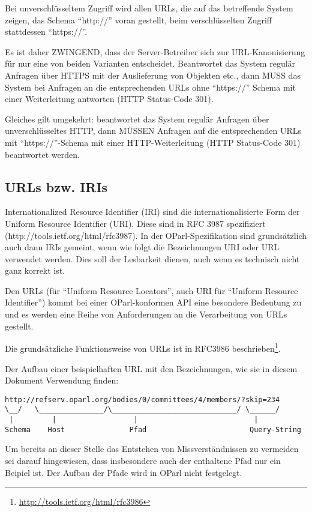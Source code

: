 \documentclass[,a4paper]{article}
\begin{document}
Bei unverschlüsseltem Zugriff wird allen URLs, die auf das betreffende
System zeigen, das Schema ``http://'' voran gestellt, beim
verschlüsselten Zugriff stattdessen ``https://''.

Es ist daher ZWINGEND, dass der Server-Betreiber sich zur
URL-Kanonisierung für nur eine von beiden Varianten entscheidet.
Beantwortet das System regulär Anfragen über HTTPS mit der Auslieferung
von Objekten etc., dann MUSS das System bei Anfragen an die
entsprechenden URLs ohne ``https://'' Schema mit einer Weiterleitung
antworten (HTTP Status-Code 301).

Gleiches gilt umgekehrt: beantwortet das System regulär Anfragen über
unverschlüsseltes HTTP, dann MÜSSEN Anfragen auf die entsprechenden URLs
mit ``https://''-Schema mit einer HTTP-Weiterleitung (HTTP Status-Code
301) beantwortet werden.

\subsection{URLs bzw. IRIs}\label{urls-bzw.-iris}

Internationalized Resource Identifier (IRI) sind die
internationalisierte Form der Uniform Resource Identifier (URI). Diese
sind in RFC 3987 spezifiziert (http://tools.ietf.org/html/rfc3987). In
der OParl-Spezifikation sind grundsätzlich auch dann IRIs gemeint, wenn
wie folgt die Bezeichnungen URI oder URL verwendet werden. Dies soll der
Lesbarkeit dienen, auch wenn es technisch nicht ganz korrekt ist.

Den URLs (für ``Uniform Resource Locators'', auch URI für ``Uniform
Resource Identifier'') kommt bei einer OParl-konformen API eine
besondere Bedeutung zu und es werden eine Reihe von Anforderungen an die
Verarbeitung von URLs gestellt.

Die grundsätzliche Funktionsweise von URLs ist in RFC3986
beschrieben\footnote{\url{http://tools.ietf.org/html/rfc3986}}.

Der Aufbau einer beispielhaften URL mit den Bezeichnungen, wie sie in
diesem Dokument Verwendung finden:

\begin{verbatim}
http://refserv.oparl.org/bodies/0/committees/4/members/?skip=234
\__/   \_______________/\_____________________________/ \______/
 |         |                  |                           |
Schema    Host               Pfad                        Query-String
\end{verbatim}

Um bereits an dieser Stelle das Entstehen von Missverständnissen zu
vermeiden sei darauf hingewiesen, dass insbesondere auch der enthaltene
Pfad nur ein Beipiel ist. Der Aufbau der Pfade wird in OParl nicht
festgelegt.
\end{document}
